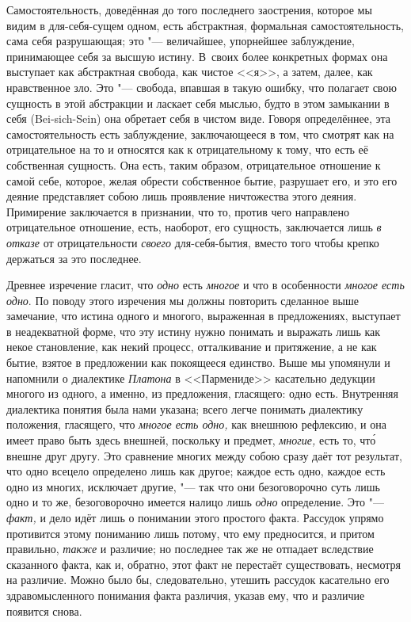 Самостоятельность, доведённая до того последнего заострения, которое мы
видим в для-себя-сущем одном, есть абстрактная, формальная
самостоятельность, сама себя разрушающая; это "--- величайшее, упорнейшее
заблуждение, принимающее себя за высшую истину. В~своих более конкретных
формах она выступает как абстрактная свобода, как чистое <<я>>, а затем,
далее, как нравственное зло. Это "--- свобода, впавшая в такую ошибку, что
полагает свою сущность в этой абстракции и ласкает себя мыслью, будто в
этом замыкании в себя (Bei-sich-Sein) она обретает себя в чистом виде.
Говоря определённее, эта самостоятельность есть заблуждение, заключающееся
в том, что смотрят как на отрицательное на то и относятся как к
отрицательному к тому, что есть её собственная сущность. Она есть, таким
образом, отрицательное отношение к самой себе, которое, желая обрести
собственное бытие, разрушает его, и это его деяние представляет собою лишь
проявление ничтожества этого деяния. Примирение заключается в признании,
что то, против чего направлено отрицательное отношение, есть, наоборот, его
сущность, заключается лишь {\em в отказе} от
отрицательности {\em своего} для-себя-бытия, вместо
того чтобы крепко держаться за это последнее.

Древнее изречение гласит, что {\em одно} есть
{\em многое} и что в особенности
{\em многое есть одно}. По поводу этого изречения мы
должны повторить сделанное выше замечание, что истина одного и многого,
выраженная в предложениях, выступает в неадекватной форме, что эту истину
нужно понимать и выражать лишь как некое становление, как некий процесс,
отталкивание и притяжение, а не как бытие, взятое в предложении как
покоящееся единство. Выше мы упомянули и напомнили о диалектике
{\em Платона} в <<Пармениде>> касательно дедукции многого
из одного, а именно, из предложения, гласящего: одно есть. Внутренняя
диалектика понятия была нами указана; всего легче понимать диалектику
положения, гласящего, что {\em многое есть одно,} как
внешнюю рефлексию, и она имеет право быть здесь внешней, поскольку и
предмет, {\em многие,} есть то, чт\'{о} внешне друг другу.
Это сравнение многих между собою сразу даёт тот результат, что одно всецело
определено лишь как другое; каждое есть одно, каждое есть одно из многих,
исключает другие, "--- так что они безоговорочно суть лишь одно и то же,
безоговорочно имеется налицо лишь {\em одно}
определение. Это "--- {\em факт,} и дело идёт лишь о
понимании этого простого факта. Рассудок упрямо противится этому пониманию
лишь потому, что ему предносится, и притом правильно,
{\em также} и различие; но последнее так же не отпадает
вследствие сказанного факта, как и, обратно, этот факт не перестаёт
существовать, несмотря на различие. Можно было бы, следовательно, утешить
рассудок касательно его здравомысленного понимания факта различия, указав
ему, что и различие появится снова.

